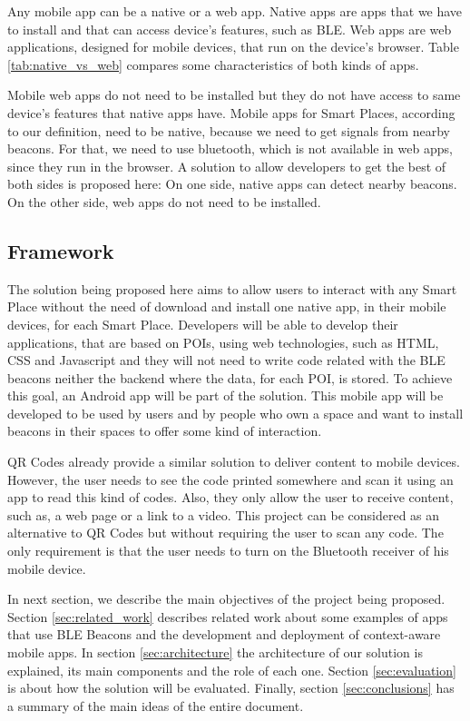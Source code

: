 Any mobile app can be a native or a web app. Native apps
are apps that we have to install and that can access
device's features, such as BLE. Web apps are web
applications, designed for mobile devices, that run
on the device's browser. Table \ref{tab:native_vs_web}
compares some characteristics of both kinds of apps.


Mobile web apps do not need to be
installed but they do not have access
to same device's features that native apps have.
Mobile apps for Smart Places, according to our definition,
need to be native, because we need to get signals from
nearby beacons. For that, we need to use bluetooth, which is
not available in web apps, since they run in the browser.
A solution to allow developers to get the best of both sides
is proposed here: On one side,
native apps can detect nearby beacons. On the other side,
web apps do not need to be installed.

\subsection{Framework}
\label{sub:framework}
The solution being proposed here aims to allow
users to interact with any Smart Place without
the need of download and install one native
app, in their mobile devices, for each Smart
Place.
Developers will be able to develop their
applications, that are based on POIs, using
web technologies, such as HTML, CSS and Javascript
and they will not need to write code related with
the BLE beacons neither the backend where the data,
for each POI, is stored.
To achieve this goal, an Android app will be part
of the solution. This mobile app will be developed
to be used by users and by people who own a space
and want to install beacons in their spaces to
offer some kind of interaction.

QR Codes already provide a similar solution to
deliver content to mobile devices.
However, the user needs to see the code printed
somewhere and scan it using an app to read
this kind of codes.
Also, they only allow the user to receive content,
such as, a web page or a link to a video.
This project can be considered as an alternative
to QR Codes but without requiring the user
to scan any code. The only requirement is that
the user needs to turn on the Bluetooth receiver
of his mobile device.

In next section, we describe the main
objectives of the project being proposed.
Section \ref{sec:related_work} describes related
work about some examples of apps that use BLE Beacons
and the development and deployment of
context-aware mobile apps.
In section \ref{sec:architecture} the architecture of our
solution is explained, 
its main components and the role of
each one.
Section \ref{sec:evaluation} is about how the solution
will be evaluated.
Finally, section \ref{sec:conclusions} has a summary of
the main ideas of the entire document.
